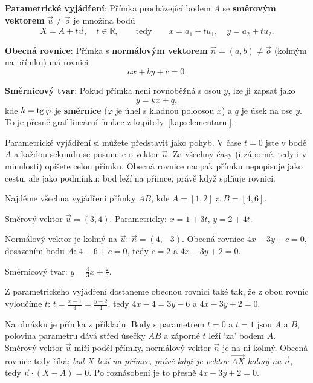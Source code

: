 \begin{definitionbox}
  \textbf{Parametrické vyjádření}: Přímka procházející bodem $A$ se \textbf{směrovým vektorem} $\vec{u}\neq\vec{o}$ je množina bodů
  \begin{equation*}
    X = A + t\vec{u},\quad t\in\mathbb{R},\qquad\text{tedy}\qquad x = a_1 + tu_1,\quad y = a_2 + tu_2.
  \end{equation*}

  \textbf{Obecná rovnice}: Přímka s \textbf{normálovým vektorem} $\vec{n} = (a, b)\neq\vec{o}$ (kolmým na přímku) má rovnici
  \begin{equation*}
    ax + by + c = 0.
  \end{equation*}

  \textbf{Směrnicový tvar}: Pokud přímka není rovnoběžná s osou $y$, lze ji zapsat jako
  \begin{equation*}
    y = kx + q,
  \end{equation*}
  kde $k = \operatorname{tg}\varphi$ je \textbf{směrnice} ($\varphi$ je úhel s kladnou poloosou $x$) a $q$ je úsek na ose $y$. To je přesně graf lineární funkce z kapitoly~\ref{kap:elementarni}.
\end{definitionbox}

Parametrické vyjádření si můžete představit jako pohyb. V čase $t = 0$ jste v bodě $A$ a každou sekundu se posunete o vektor $\vec{u}$. Za všechny časy (i záporné, tedy i v minulosti) opíšete celou přímku. Obecná rovnice naopak přímku nepopisuje jako cestu, ale jako podmínku: bod leží na přímce, právě když splňuje rovnici.

\begin{example}
  Najděme všechna vyjádření přímky $AB$, kde $A = [1, 2]$ a $B = [4, 6]$.

  Směrový vektor $\vec{u} = (3, 4)$. Parametricky: $x = 1 + 3t$, $y = 2 + 4t$.

  Normálový vektor je kolmý na $\vec{u}$: $\vec{n} = (4, -3)$. Obecná rovnice $4x - 3y + c = 0$, dosazením bodu $A$: $4 - 6 + c = 0$, tedy $c = 2$ a $4x - 3y + 2 = 0$.

  Směrnicový tvar: $y = \frac{4}{3}x + \frac{2}{3}$.

  Z parametrického vyjádření dostaneme obecnou rovnici také tak, že z obou rovnic vyloučíme $t$: $t = \frac{x - 1}{3} = \frac{y - 2}{4}$, tedy $4x - 4 = 3y - 6$ a $4x - 3y + 2 = 0$.
\end{example}

Na obrázku je přímka z příkladu. Body s parametrem $t = 0$ a $t = 1$ jsou $A$ a $B$, polovina parametru dává střed úsečky $AB$ a záporné $t$ leží `za' bodem $A$. Směrový vektor $\vec{u}$ míří podél přímky, normálový vektor $\vec{n}$ je na ni kolmý. Obecná rovnice tedy říká: \textit{bod $X$ leží na přímce, právě když je vektor $\overrightarrow{AX}$ kolmý na $\vec{n}$}, tedy $\vec{n}\cdot(X - A) = 0$. Po roznásobení je to přesně $4x - 3y + 2 = 0$.

